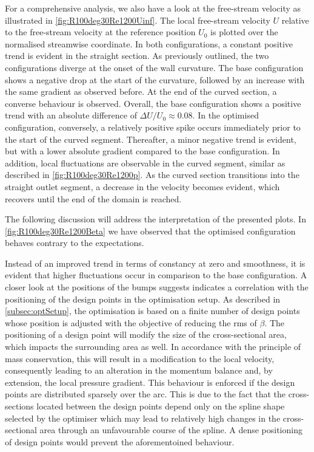 For a comprehensive analysis, we also have a look at the free-stream velocity as illustrated in \autoref{fig:R100deg30Re1200Uinf}.
The local free-stream velocity $U$ relative to the free-stream velocity at the reference position $U_0$ is plotted over the normalised streamwise coordinate.
In both configurations, a constant positive trend is evident in the straight section.
As previously outlined, the two configurations diverge at the onset of the wall curvature.
The base configuration shows a negative drop at the start of the curvature, followed by an increase with the same gradient as observed before.
At the end of the curved section, a converse behaviour is observed.
Overall, the base configuration shows a positive trend with an absolute difference of $\Delta U/U_0 \approx 0.08$.
In the optimised configuration, conversely, a relatively positive spike occurs immediately prior to the start of the curved segment.
Thereafter, a minor negative trend is evident, but with a lower absolute gradient compared to the base configuration.
In addition, local fluctuations are observable in the curved segment, similar as described in \autoref{fig:R100deg30Re1200p}.
As the curved section transitions into the straight outlet segment, a decrease in the velocity becomes evident, which recovers until the end of the domain is reached.


The following discussion will address the interpretation of the presented plots. 
In \autoref{fig:R100deg30Re1200Beta} we have observed that the optimised configuration behaves contrary to the expectations.


Instead of an improved trend in terms of constancy at zero and smoothness, it is evident that higher fluctuations occur in comparison to the base configuration.
A closer look at the positions of the bumps suggests indicates a correlation with the positioning of the design points in the optimisation setup.
As described in \autoref{subsec:optSetup}, the optimisation is based on a finite number of design points whose position is adjusted with the objective of reducing the \acrfull{rms} of $\beta$.
The positioning of a design point will modify the size of the cross-sectional area, which impacts the surrounding area as well.
In accordance with the principle of mass conservation, this will result in a modification to the local velocity, consequently leading to an alteration in the momentum balance and, by extension, the local pressure gradient.
This behaviour is enforced if the design points are distributed sparsely over the arc.
This is due to the fact that the cross-sections located between the design points depend only on the spline shape selected by the optimiser which may lead to relatively high changes in the cross-sectional area through an unfavourable course of the spline.
A dense positioning of design points would prevent the aforementoined behaviour.



